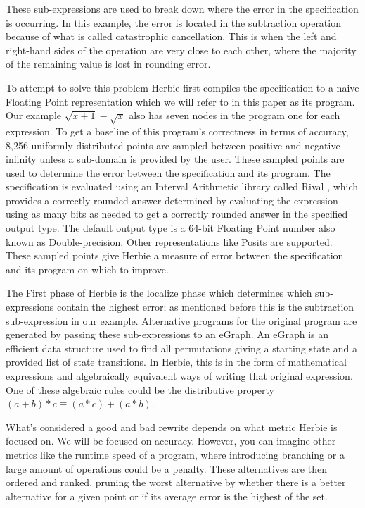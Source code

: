 \documentclass{article}
\begin{document}
These sub-expressions are used to break down where the error in the specification is occurring. In this example, the error is located in the subtraction operation because of what is called catastrophic cancellation. This is when the left and right-hand sides of the operation are very close to each other, where the majority of the remaining value is lost in rounding error. 

To attempt to solve this problem Herbie first compiles the specification to a naive Floating Point representation which we will refer to in this paper as its program. Our example $\sqrt{x + 1} - \sqrt{x}$ also has seven nodes in the program one for each expression. To get a baseline of this program's correctness in terms of accuracy, 8,256 uniformly distributed points are sampled between positive and negative infinity unless a sub-domain is provided by the user. These sampled points are used to determine the error between the specification and its program. The specification is evaluated using an Interval Arithmetic library called Rival \cite{Rival}, which provides a correctly rounded answer determined by evaluating the expression using as many bits as needed to get a correctly rounded answer in the specified output type. The default output type is a 64-bit Floating Point number also known as Double-precision. Other representations like Posits \cite{Posit} are supported. These sampled points give Herbie a measure of error between the specification and its program on which to improve. 

The First phase of Herbie is the localize phase which determines which sub-expressions contain the highest error; as mentioned before this is the subtraction sub-expression in our example. Alternative programs for the original program are generated by passing these sub-expressions to an eGraph. An eGraph is an efficient data structure used to find all permutations giving a starting state and a provided list of state transitions. In Herbie, this is in the form of mathematical expressions and algebraically equivalent ways of writing that original expression. One of these algebraic rules could be the distributive property $(a +b) * c \equiv (a * c) + ( a * b)$. 

What's considered a good and bad rewrite depends on what metric Herbie is focused on. We will be focused on accuracy. However, you can imagine other metrics like the runtime speed of a program, where introducing branching or a large amount of operations could be a penalty. These alternatives are then ordered and ranked, pruning the worst alternative by whether there is a better alternative for a given point or if its average error is the highest of the set.
\end{document}
